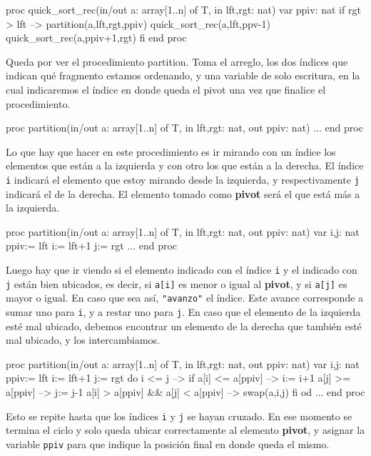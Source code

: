 \begin{pascallike}
proc quick_sort_rec(in/out a: array[1..n] of T, in lft,rgt: nat)
    var ppiv: nat
    if rgt > lft --> 
        partition(a,lft,rgt,ppiv)
        quick_sort_rec(a,lft,ppv-1)
        quick_sort_rec(a,ppiv+1,rgt)
    fi
end proc
\end{pascallike}
Queda por ver el procedimiento partition. Toma el arreglo, los dos índices que indican qué fragmento estamos ordenando, y una variable de solo escritura, en la cual indicaremos el índice en donde queda el pivot una vez que finalice el procedimiento.
\begin{pascallike}
proc partition(in/out a: array[1..n] of T, in lft,rgt: nat, out ppiv: nat)
...
end proc
\end{pascallike}
Lo que hay que hacer en este procedimiento es ir mirando con un índice los elementos que están a la izquierda y con otro los que están a la derecha. El índice \texttt{i} indicará el elemento que estoy mirando desde la izquierda, y respectivamente \texttt{j} indicará el de la derecha. El elemento tomado como \textbf{pivot} será el que está más a la izquierda.
\begin{pascallike}
proc partition(in/out a: array[1..n] of T, in lft,rgt: nat, out ppiv: nat)
    var i,j: nat
    ppiv:= lft
    i:= lft+1
    j:= rgt
    ...
end proc
\end{pascallike}
Luego hay que ir viendo si el elemento indicado con el índice \texttt{i} y el indicado con \texttt{j} están bien ubicados, es decir, si \texttt{a[i]} es menor o igual al \textbf{pivot}, y si \texttt{a[j]} es mayor o igual. En caso que sea así, \texttt{"avanzo"} el índice. Este avance corresponde a sumar uno para \texttt{i}, y a restar uno para \texttt{j}. En caso que el elemento de la izquierda esté mal ubicado, debemos encontrar un elemento de la derecha que también esté mal ubicado, y los intercambiamos.
\begin{pascallike}
proc partition(in/out a: array[1..n] of T, in lft,rgt: nat, out ppiv: nat)
    var i,j: nat
    ppiv:= lft
    i:= lft+1
    j:= rgt
    do i <= j -->
        if a[i] <= a[ppiv] --> i:= i+1
           a[j] >= a[ppiv] --> j:= j-1
           a[i] > a[ppiv] && a[j] < a[ppiv] --> swap(a,i,j)
        fi
    od
...
end proc
\end{pascallike}
Esto se repite hasta que los índices \texttt{i} y \texttt{j} se hayan cruzado. En ese momento se termina el ciclo y solo queda ubicar correctamente al elemento \textbf{pivot}, y asignar la variable \texttt{ppiv} para que indique la posición final en donde queda el mismo.
